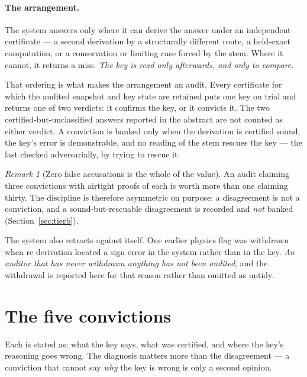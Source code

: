 \documentclass[11pt,a4paper]{article}
\theoremstyle{remark}
\newtheorem{remark}[definition]{Remark}
\begin{document}
\paragraph{The arrangement.}
The system answers only where it can derive the answer under an independent certificate --- a second
derivation by a structurally different route, a held-exact computation, or a conservation or limiting
case forced by the stem. Where it cannot, it returns a miss. \emph{The key is read only afterwards,
and only to compare.}

That ordering is what makes the arrangement an audit. Every certificate for which the audited
snapshot and key state are retained puts one key on trial and returns one of two verdicts: it confirms
the key, or it convicts it. The two certified-but-unclassified answers reported in the abstract are not
counted as either verdict. A conviction is banked only when the derivation is certified sound, the key's
error is demonstrable, and no reading of the stem rescues the key --- the last checked adversarially, by
trying to rescue it.

\begin{remark}[Zero false accusations is the whole of the value]\label{rem:zero}
An audit claiming three convictions with airtight proofs of each is worth more than one claiming
thirty. The discipline is therefore asymmetric on purpose: a disagreement is not a conviction, and a
sound-but-rescuable disagreement is recorded and \emph{not} banked (Section~\ref{sec:tierb}).

The system also retracts against itself. One earlier physics flag was withdrawn when re-derivation
located a sign error in the system rather than in the key. \emph{An auditor that has never withdrawn
anything has not been audited}, and the withdrawal is reported here for that reason rather than
omitted as untidy.
\end{remark}

\section{The five convictions}\label{sec:convictions}
Each is stated as: what the key says, what was certified, and where the key's reasoning goes wrong.
The diagnosis matters more than the disagreement --- a conviction that cannot say \emph{why} the key
is wrong is only a second opinion.
\end{document}
